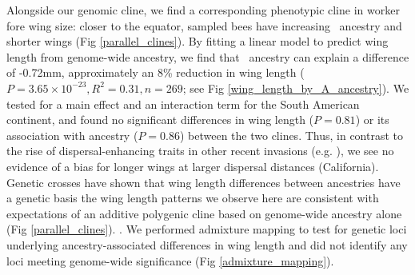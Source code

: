 Alongside our genomic cline, we find a corresponding phenotypic cline in worker fore wing size: closer to the equator, sampled bees have increasing \A\ ancestry and shorter wings (Fig \ref{parallel_clines}). By fitting a linear model to predict wing length from genome-wide ancestry, we find that \A\ ancestry can explain a difference of -0.72mm, approximately an 8\% reduction in wing length ($P = 3.65\times10^{-23}, R^2=0.31, n = 269$; see Fig \ref{wing_length_by_A_ancestry}). We tested for a main effect and an interaction term for the South American continent, and found no significant differences in wing length ($P = 0.81$) or its association with ancestry ($P = 0.86$) between the two clines. Thus, in contrast to the rise of dispersal-enhancing traits in other recent invasions (e.g. \cite{Simmons:2015bh, Cwynar:1987, Phillips:2006dc, Hill:1999di}), we see no evidence of a bias for longer wings at larger dispersal distances (California). Genetic crosses have shown that wing length differences between ancestries have a genetic basis \cite{Hunt:1998th}  the wing length patterns we observe here are consistent with expectations of an additive polygenic cline based on genome-wide ancestry alone (Fig \ref{parallel_clines}). . We performed admixture mapping to test for genetic loci underlying ancestry-associated differences in wing length and did not identify any loci meeting genome-wide significance (Fig \ref{admixture_mapping}).

